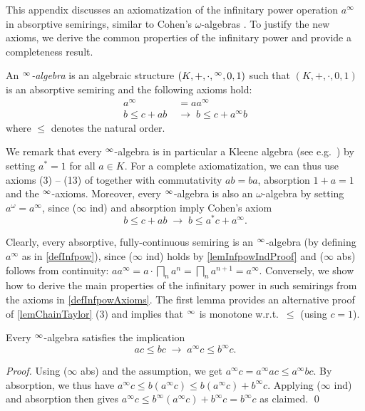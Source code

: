 \documentclass[english,runningheads,a4paper,envcountsame]{llncs}
\newenvironment{Definition}{\definition\upshape}{\enddefinition}
\newcommand{\Inf}{\bigsqcap}
\begin{document}
This appendix discusses an axiomatization of the infinitary power operation $a^\infty$ in absorptive semirings, similar to Cohen's $\omega$-algebras \cite{Cohen00}.
To justify the new axioms, we derive the common properties of the infinitary power and provide a completeness result.

\begin{Definition}\label{defInfpowAxioms}
An \emph{${}^\infty$-algebra} is an algebraic structure $(K,+,\cdot,{}^\infty,0,1)$ such that $(K, +, \cdot, 0, 1)$ is an absorptive semiring and the following axioms hold:
\begin{align*}
a^\infty &= a a^\infty \tag{$\infty$ abs}\\
b \le c + ab \;&\to\; b \le c + a^\infty b \tag{$\infty$ ind}
\end{align*}
where $\le$ denotes the natural order.
\end{Definition}

We remark that every ${}^\infty$-algebra is in particular a Kleene algebra (see e.g.\ \cite{Kozen94}) by setting $a^* = 1$ for all $a \in K$.
For a complete axiomatization, we can thus use axioms (3) -- (13) of \cite{Kozen94} together with commutativity $ab=ba$, absorption $1 + a = 1$ and the ${}^\infty$-axioms.
Moreover, every ${}^\infty$-algebra is also an $\omega$-algebra by setting $a^\omega = a^\infty$,
since ($\infty$ ind) and absorption imply Cohen's axiom
\[
  b \le c + ab \;\to\; b \le a^*c + a^\infty. \tag{$\star$ ind}
\]

Clearly, every absorptive, fully-continuous semiring is an ${}^\infty$-algebra (by defining $a^\infty$ as in \cref{defInfpow}), since ($\infty$ ind) holds by \cref{lemInfpowIndProof} and ($\infty$ abs) follows from continuity: $a a^\infty = a \cdot \Inf_n a^n = \Inf_n a^{n+1} = a^\infty$.
Conversely, we show how to derive the main properties of the infinitary power in such semirings from the axioms in \cref{defInfpowAxioms}.
The first lemma provides an alternative proof of \cref{lemChainTaylor} (3) and implies that ${}^\infty$ is monotone w.r.t.\ $\le$ (using $c=1$).

\begin{lemma}
Every ${}^\infty$-algebra satisfies the implication
\[
  ac \le bc \;\to\; a^\infty c \le b^\infty c.
\]
\end{lemma}
\begin{proof}
Using ($\infty$ abs) and the assumption, we get $a^\infty c = a^\infty a c \le a^\infty bc$.
By absorption, we thus have $a^\infty c \le b(a^\infty c) \le b(a^\infty c) + b^\infty c$.
Applying ($\infty$ ind) and absorption then gives $a^\infty c \le b^\infty (a^\infty c) + b^\infty c = b^\infty c$ as claimed. \qed
\end{proof}
\end{document}
